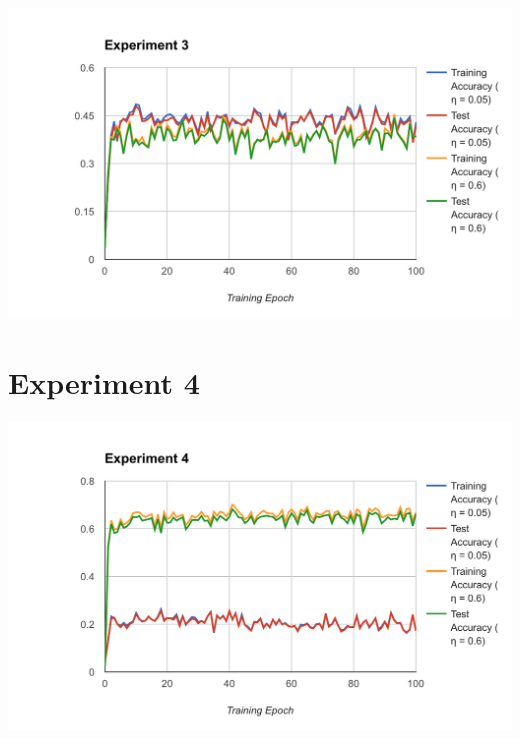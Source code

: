 \documentclass[11pt, oneside]{article}    %
\begin{document}
\begin{center}
	\includegraphics[width=6in]{Exp3}
\end{center}

\section*{Experiment 4}

\begin{center}
	\includegraphics[width=6in]{Exp4}
\end{center}
\end{document}
